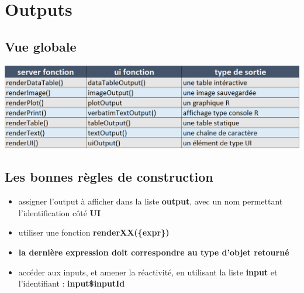 \documentclass[]{article}
\newenvironment{Shaded}{\begin{snugshade}}{\end{snugshade}}
\newcommand{\KeywordTok}[1]{\textcolor[rgb]{0.13,0.29,0.53}{\textbf{#1}}}
\newcommand{\DataTypeTok}[1]{\textcolor[rgb]{0.13,0.29,0.53}{#1}}
\newcommand{\DecValTok}[1]{\textcolor[rgb]{0.00,0.00,0.81}{#1}}
\newcommand{\StringTok}[1]{\textcolor[rgb]{0.31,0.60,0.02}{#1}}
\newcommand{\CommentTok}[1]{\textcolor[rgb]{0.56,0.35,0.01}{\textit{#1}}}
\newcommand{\OperatorTok}[1]{\textcolor[rgb]{0.81,0.36,0.00}{\textbf{#1}}}
\newcommand{\NormalTok}[1]{#1}
\providecommand{\tightlist}{%
  \setlength{\itemsep}{0pt}\setlength{\parskip}{0pt}}
\begin{document}
\section{Outputs}\label{outputs}

\subsection{Vue globale}\label{vue-globale-1}

\includegraphics{img/all_output.png}

\subsection{Les bonnes règles de
construction}\label{les-bonnes-regles-de-construction}

\begin{itemize}
\tightlist
\item
  assigner l'output à afficher dans la liste \textbf{output}, avec un
  nom permettant l'identification côté \textbf{UI}
\item
  utiliser une fonction \textbf{renderXX(\{expr\})}
\item
  \textbf{la dernière expression doit correspondre au type d'objet
  retourné}
\item
  accéder aux inputs, et amener la réactivité, en utilisant la liste
  \textbf{input} et l'identifiant : \textbf{input\$inputId}
\end{itemize}

\begin{Shaded}
\end{Shaded}
\end{document}
